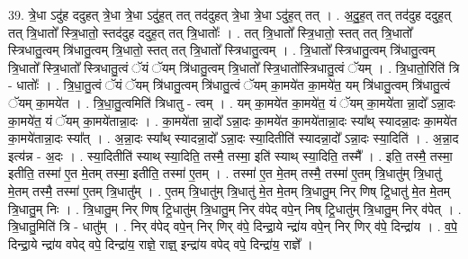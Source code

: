 \documentclass[17pt]{extarticle}
\begin{document}
39. त्रे॒धा ऽदु॑ह ददुहत् त्रे॒धा त्रे॒धा ऽदु॑ह॒त् तत् तद॑दुहत् त्रे॒धा त्रे॒धा ऽदु॑ह॒त् तत् । . अ॒दु॒ह॒त् तत् तद॑दुह ददुह॒त् तत् त्रि॒धातो᳚ स्त्रि॒धातो॒ स्तद॑दुह ददुह॒त् तत् त्रि॒धातोः᳚ । . तत् त्रि॒धातो᳚ स्त्रि॒धातो॒ स्तत् तत् त्रि॒धातो᳚ स्त्रिधातु॒त्वम् त्रि॑धातु॒त्वम् त्रि॒धातो॒ स्तत् तत् त्रि॒धातो᳚ स्त्रिधातु॒त्वम् । . त्रि॒धातो᳚ स्त्रिधातु॒त्वम् त्रि॑धातु॒त्वम् त्रि॒धातो᳚ स्त्रि॒धातो᳚ स्त्रिधातु॒त्वं ॅयं ॅयम् त्रि॑धातु॒त्वम् त्रि॒धातो᳚ स्त्रि॒धातो᳚स्त्रिधातु॒त्वं ॅयम् । . त्रि॒धातो॒रिति॑ त्रि - धातोः᳚ । . त्रि॒धा॒तु॒त्वं ॅयं ॅयम् त्रि॑धातु॒त्वम् त्रि॑धातु॒त्वं ॅयम् का॒मये॑त का॒मये॑त॒ यम् त्रि॑धातु॒त्वम् त्रि॑धातु॒त्वं ॅयम् का॒मये॑त । . त्रि॒धा॒तु॒त्वमिति॑ त्रिधातु - त्वम् । . यम् का॒मये॑त का॒मये॑त॒ यं ॅयम् का॒मये॑ता न्ना॒दो᳚ ऽन्ना॒दः का॒मये॑त॒ यं ॅयम् का॒मये॑तान्ना॒दः । . का॒मये॑ता न्ना॒दो᳚ ऽन्ना॒दः का॒मये॑त का॒मये॑तान्ना॒दः स्या᳚थ् स्यादन्ना॒दः का॒मये॑त का॒मये॑तान्ना॒दः स्या᳚त् । . अ॒न्ना॒दः स्या᳚थ् स्यादन्ना॒दो᳚ ऽन्ना॒दः स्या॒दितीति॑ स्यादन्ना॒दो᳚ ऽन्ना॒दः स्या॒दिति॑ । . अ॒न्ना॒द इत्य॑न्न - अ॒दः । . स्या॒दितीति॑ स्याथ् स्या॒दिति॒ तस्मै॒ तस्मा॒ इति॑ स्याथ् स्या॒दिति॒ तस्मै᳚ । . इति॒ तस्मै॒ तस्मा॒ इतीति॒ तस्मा॑ ए॒त मे॒तम् तस्मा॒ इतीति॒ तस्मा॑ ए॒तम् । . तस्मा॑ ए॒त मे॒तम् तस्मै॒ तस्मा॑ ए॒तम् त्रि॒धातु॑म् त्रि॒धातु॑ मे॒तम् तस्मै॒ तस्मा॑ ए॒तम् त्रि॒धातु᳚म् । . ए॒तम् त्रि॒धातु॑म् त्रि॒धातु॑ मे॒त मे॒तम् त्रि॒धातु॒म् निर् णिष् ट्रि॒धातु॑ मे॒त मे॒तम् त्रि॒धातु॒म् निः । . त्रि॒धातु॒म् निर् णिष् ट्रि॒धातु॑म् त्रि॒धातु॒म् निर् व॑पेद् वपे॒न् निष् ट्रि॒धातु॑म् त्रि॒धातु॒म् निर् व॑पेत् । . त्रि॒धातु॒मिति॑ त्रि - धातु᳚म् । . निर् व॑पेद् वपे॒न् निर् णिर् व॑पे॒ दिन्द्रा॒ये न्द्रा॑य वपे॒न् निर् णिर् व॑पे॒ दिन्द्रा॑य । . व॒पे॒ दिन्द्रा॒ये न्द्रा॑य वपेद् वपे॒ दिन्द्रा॑य॒ राज्ञे॒ राज्ञ्॒ इन्द्रा॑य वपेद् वपे॒ दिन्द्रा॑य॒ राज्ञे᳚ । \newline
\end{document}

